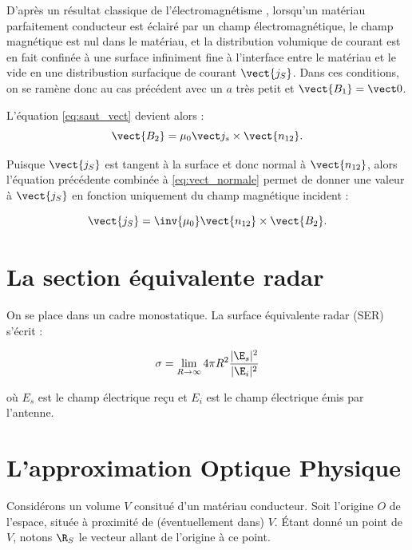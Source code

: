 D'après un résultat classique de l'électromagnétisme \citep{Green1871}, lorsqu'un matériau parfaitement conducteur est éclairé par un champ électromagnétique, le champ magnétique est nul dans le matériau, et la distribution volumique de courant est en fait confinée à une surface infiniment fine à l'interface entre le matériau et le vide en une distribustion surfacique de courant $\vect{j_S}$. Dans ces conditions, on se ramène donc au cas précédent avec un $a$ très petit et $\vect{B_1} = \vect 0$.

L'équation \eqref{eq:saut_vect} devient alors :
\begin{equation}
	\vect{B_2} = \mu_0 \vect j_s\times\vect{n_{12}}.
\end{equation}

Puisque $\vect{j_S}$ est tangent à la surface et donc normal à $\vect{n_{12}}$, alors l'équation précédente combinée à \eqref{eq:vect_normale} permet de donner une valeur à $\vect{j_S}$ en fonction uniquement du champ magnétique incident :

\begin{equation}
	\label{eq:saut_courant}
	\vect{j_S} = \inv{\mu_0}\vect{n_{12}}\times\vect{B_2}.
\end{equation}




\section[SER]{La section équivalente radar}
\label{sec:rcs}

On se place dans un cadre monostatique. La surface équivalente radar (SER) s'écrit :

\begin{equation}
	\label{eq:rcs_lim}
	\sigma = \lim_{R\to\infty}4\pi R^2 \frac{|\E_s|^2}{|\E_i|^2}
\end{equation}

où $E_s$ est le champ électrique reçu et $E_i$ est le champ électrique émis par l'antenne.

\section[Approximation PO]{L'approximation Optique Physique}
\label{sec:equation_OP}

Considérons un volume $V$ consitué d'un matériau conducteur. Soit l'origine $O$ de l'espace, située à proximité de (éventuellement dans) $V$. \'Etant donné un point de $V$, notons $\R_S$ le vecteur allant de l'origine à ce point.

